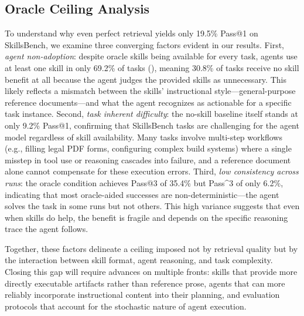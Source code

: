 \documentclass[11pt]{article}
\begin{document}
\subsection{Oracle Ceiling Analysis}
\label{sec:oracle_ceiling}

To understand why even perfect retrieval yields only 19.5\% Pass@1 on SkillsBench, we examine three converging factors evident in our results.
First, \emph{agent non-adoption}: despite oracle skills being available for every task, agents use at least one skill in only 69.2\% of tasks (), meaning 30.8\% of tasks receive no skill benefit at all because the agent judges the provided skills as unnecessary.
This likely reflects a mismatch between the skills' instructional style---general-purpose reference documents---and what the agent recognizes as actionable for a specific task instance.
Second, \emph{task inherent difficulty}: the no-skill baseline itself stands at only 9.2\% Pass@1, confirming that SkillsBench tasks are challenging for the agent model regardless of skill availability.
Many tasks involve multi-step workflows (e.g., filling legal PDF forms, configuring complex build systems) where a single misstep in tool use or reasoning cascades into failure, and a reference document alone cannot compensate for these execution errors.
Third, \emph{low consistency across runs}: the oracle condition achieves Pass@3 of 35.4\% but Pass\textasciicircum3 of only 6.2\%, indicating that most oracle-aided successes are non-deterministic---the agent solves the task in some runs but not others.
This high variance suggests that even when skills do help, the benefit is fragile and depends on the specific reasoning trace the agent follows.

Together, these factors delineate a ceiling imposed not by retrieval quality but by the interaction between skill format, agent reasoning, and task complexity.
Closing this gap will require advances on multiple fronts: skills that provide more directly executable artifacts rather than reference prose, agents that can more reliably incorporate instructional content into their planning, and evaluation protocols that account for the stochastic nature of agent execution.
\end{document}
